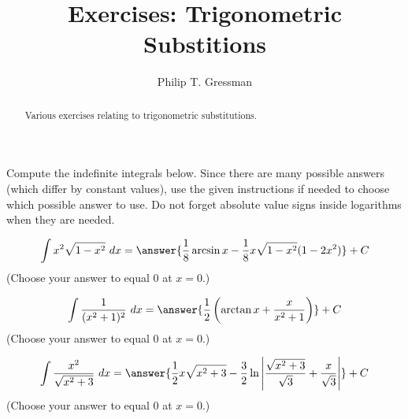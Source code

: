 \documentclass{ximera}
\title{Exercises: Trigonometric Substitions}
\author{Philip T. Gressman}
\begin{document}
\begin{abstract}
Various exercises relating to trigonometric substitutions.
\end{abstract}
\maketitle


Compute the indefinite integrals below. Since there are many possible answers (which differ by constant values), use the given instructions if needed to choose which possible answer to use. Do not forget absolute value signs inside logarithms when they are needed.

\begin{exercise}%
\[ \int x^2\sqrt{1-x^2}\ dx = \answer{\frac{1}{8}\arcsin x-\frac{1}{8}x\sqrt{1-x^2}(1-2x^2)}+C\] 
(Choose your answer to equal $0$ at $x = 0$.)
%
%
\end{exercise}

\begin{exercise}%
\[  \int \frac {1}{(x^2+1)^2}\ dx = \answer{\frac{1}{2}\left(\arctan x+\frac{x}{x^2+1}\right)} +C\]
(Choose your answer to equal $0$ at $x = 0$.)
%
%
\end{exercise}

\begin{exercise}%
\[  \int \frac{x^2}{\sqrt{x^2+3}}\ dx = \answer{\frac{1}{2}x\sqrt{x^2+3}-\frac{3}{2}\ln\left|\frac{\sqrt{x^2+3}}{\sqrt{3}}+\frac{x}{\sqrt{3}}\right|} +C\]
(Choose your answer to equal $0$ at $x = 0$.)
%
%
\end{exercise}
\end{document}
